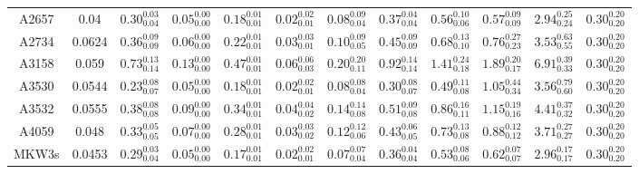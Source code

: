 \begin{table}
\begin{ruledtabular}
\begin{tabular}{c c c c c c c c c c c c}
     A2657 & 0.04 & $0.30^{0.03}_{0.04}$ & $0.05^{0.00}_{0.00}$ & $0.18^{0.01}_{0.01}$ & $0.02^{0.02}_{0.01}$ & $0.08^{0.09}_{0.04}$ & $0.37^{0.04}_{0.04}$ & $0.56^{0.10}_{0.06}$ & $0.57^{0.09}_{0.09}$ & $2.94^{0.25}_{0.24}$ & $0.30^{0.20}_{0.20}$ \\
     A2734 & 0.0624 & $0.36^{0.09}_{0.09}$ & $0.06^{0.00}_{0.00}$ & $0.22^{0.01}_{0.01}$ & $0.03^{0.03}_{0.01}$ & $0.10^{0.09}_{0.05}$ & $0.45^{0.09}_{0.09}$ & $0.68^{0.13}_{0.10}$ & $0.76^{0.27}_{0.23}$ & $3.53^{0.63}_{0.55}$ & $0.30^{0.20}_{0.20}$ \\
     A3158 & 0.059 & $0.73^{0.13}_{0.14}$ & $0.13^{0.00}_{0.00}$ & $0.47^{0.01}_{0.01}$ & $0.06^{0.06}_{0.03}$ & $0.20^{0.20}_{0.11}$ & $0.92^{0.14}_{0.14}$ & $1.41^{0.24}_{0.18}$ & $1.89^{0.20}_{0.17}$ & $6.91^{0.39}_{0.33}$ & $0.30^{0.20}_{0.20}$ \\
     A3530 & 0.0544 & $0.23^{0.08}_{0.07}$ & $0.05^{0.00}_{0.00}$ & $0.18^{0.01}_{0.01}$ & $0.02^{0.02}_{0.01}$ & $0.08^{0.08}_{0.04}$ & $0.30^{0.08}_{0.07}$ & $0.49^{0.11}_{0.08}$ & $1.05^{0.44}_{0.34}$ & $3.56^{0.79}_{0.60}$ & $0.30^{0.20}_{0.20}$ \\
     A3532 & 0.0555 & $0.38^{0.08}_{0.08}$ & $0.09^{0.00}_{0.00}$ & $0.34^{0.01}_{0.01}$ & $0.04^{0.04}_{0.02}$ & $0.14^{0.14}_{0.08}$ & $0.51^{0.09}_{0.08}$ & $0.86^{0.16}_{0.11}$ & $1.15^{0.19}_{0.16}$ & $4.41^{0.37}_{0.32}$ & $0.30^{0.20}_{0.20}$ \\
     A4059 & 0.048 & $0.33^{0.05}_{0.05}$ & $0.07^{0.00}_{0.00}$ & $0.28^{0.01}_{0.01}$ & $0.03^{0.03}_{0.02}$ & $0.12^{0.12}_{0.06}$ & $0.43^{0.06}_{0.05}$ & $0.73^{0.13}_{0.08}$ & $0.88^{0.12}_{0.12}$ & $3.71^{0.27}_{0.27}$ & $0.30^{0.20}_{0.20}$ \\
     MKW3s & 0.0453 & $0.29^{0.03}_{0.04}$ & $0.05^{0.00}_{0.00}$ & $0.17^{0.01}_{0.01}$ & $0.02^{0.02}_{0.01}$ & $0.07^{0.07}_{0.04}$ & $0.36^{0.04}_{0.04}$ & $0.53^{0.08}_{0.06}$ & $0.62^{0.07}_{0.07}$ & $2.96^{0.17}_{0.17}$ & $0.30^{0.20}_{0.20}$ \\
     

\end{tabular}
\end{ruledtabular}
\end{table}
